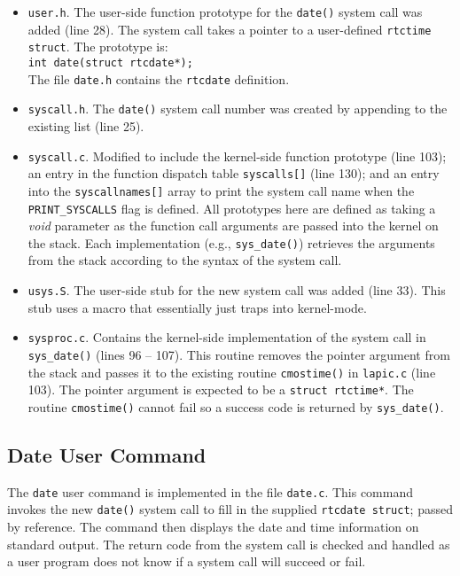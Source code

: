 \documentclass[11pt,letterpaper]{report}
\begin{document}
	\begin{itemize}

	\item {\tt user.h}. The user-side function prototype for the {\tt date()} system call was added ({\color{red}line 28}). The system call takes a pointer to a user-defined {\tt rtctime struct}. The prototype is:\\
	{\tt int date(struct rtcdate*);} \\
	The file {\tt date.h} contains the {\tt rtcdate} definition.
	
	\item {\tt syscall.h}. The {\tt date()} system call number was created by appending to the existing list ({\color{red}line 25}).
	
	\item {\tt syscall.c}. Modified to include the kernel-side function prototype ({\color{red}line 103}); an entry in the function dispatch table {\tt syscalls[]} ({\color{red}line 130}); and an entry into the {\tt syscallnames[]} array to print the system call name when the {\tt PRINT\_SYSCALLS} flag is defined. All prototypes here are defined as taking a \emph{void} parameter as the function call arguments are passed into the kernel on the stack. Each implementation (e.g., {\tt sys\_date()})  retrieves the arguments from the stack according to the syntax of the system call.
	
	\item {\tt usys.S}. The user-side stub for the new system call was added ({\color{red}line 33}). This stub uses a macro that essentially just traps into kernel-mode.
	
	\item {\tt sysproc.c}. Contains the kernel-side implementation  of the system call in {\tt sys\_date()} ({\color{red}lines 96 -- 107}). This routine removes the pointer argument from the stack and passes it to the existing routine {\tt cmostime()} in {\tt lapic.c} ({\color{red}line 103}). The pointer argument is expected to be a {\tt struct rtctime*}. The routine {\tt cmostime()} cannot fail so a success code is returned by {\tt sys\_date()}.
	
	\end{itemize}
	
	\subsection*{Date User Command}
	The {\tt date} user command is implemented in the file {\tt date.c}. This command invokes the new {\tt date()} system call to fill in the supplied {\tt rtcdate struct}; passed by reference. The command then displays the date and time information on standard output. The return code from the system call is checked and handled as a user program does not know if a system call will succeed or fail. \\
	
\end{document}
